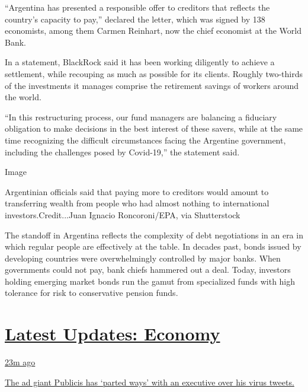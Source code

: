 ``Argentina has presented a responsible offer to creditors that reflects
the country's capacity to pay,'' declared the letter, which was signed
by 138 economists, among them Carmen Reinhart, now the chief economist
at the World Bank.

In a statement, BlackRock said it has been working diligently to achieve
a settlement, while recouping as much as possible for its clients.
Roughly two-thirds of the investments it manages comprise the retirement
savings of workers around the world.

``In this restructuring process, our fund managers are balancing a
fiduciary obligation to make decisions in the best interest of these
savers, while at the same time recognizing the difficult circumstances
facing the Argentine government, including the challenges posed by
Covid-19,'' the statement said.

Image

Argentinian officials said that paying more to creditors would amount to
transferring wealth from people who had almost nothing to international
investors.Credit...Juan Ignacio Roncoroni/EPA, via Shutterstock

The standoff in Argentina reflects the complexity of debt negotiations
in an era in which regular people are effectively at the table. In
decades past, bonds issued by developing countries were overwhelmingly
controlled by major banks. When governments could not pay, bank chiefs
hammered out a deal. Today, investors holding emerging market bonds run
the gamut from specialized funds with high tolerance for risk to
conservative pension funds.

\hypertarget{latest-updates-economy}{%
\section{\texorpdfstring{\href{https://www.nytimes3xbfgragh.onion/live/2020/08/04/business/stock-market-today-coronavirus?action=click\&pgtype=Article\&state=default\&region=MAIN_CONTENT_1\&context=storylines_live_updates}{Latest
Updates:
Economy}}{Latest Updates: Economy}}\label{latest-updates-economy}}

\href{https://www.nytimes3xbfgragh.onion/live/2020/08/04/business/stock-market-today-coronavirus?action=click\&pgtype=Article\&state=default\&region=MAIN_CONTENT_1\&context=storylines_live_updates\#the-ad-giant-publicis-has-parted-ways-with-an-executive-over-his-virus-tweets}{23m
ago}

\href{https://www.nytimes3xbfgragh.onion/live/2020/08/04/business/stock-market-today-coronavirus?action=click\&pgtype=Article\&state=default\&region=MAIN_CONTENT_1\&context=storylines_live_updates\#the-ad-giant-publicis-has-parted-ways-with-an-executive-over-his-virus-tweets}{The
ad giant Publicis has `parted ways' with an executive over his virus
tweets.}

